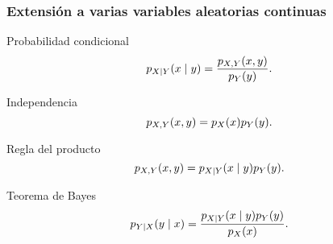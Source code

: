 \documentclass[table]{beamer}
\begin{document}
\begin{frame}
    \frametitle{Extensión a varias variables aleatorias continuas}
    \begin{block}{Probabilidad condicional}
        \begin{equation*}
            \ppdf{X \mid Y}{x \mid y} = \frac{\ppdf{X, Y}{x, y}}{\ppdf{Y}{y}} .
        \end{equation*}
    \end{block}
    \begin{block}{Independencia}
        \begin{equation*}
            \ppdf{X, Y}{x, y} = \ppdf{X}{x} \ppdf{Y}{y} .
        \end{equation*}
    \end{block}
    \begin{block}{Regla del producto}
        \begin{equation*}
            \ppdf{X, Y}{x, y} = \ppdf{X \mid Y}{x \mid y} \ppdf{Y}{y} .
        \end{equation*}
    \end{block}
    \begin{block}{Teorema de Bayes}
        \begin{equation*}
            \ppdf{Y \mid X}{y \mid x} = \frac{\ppdf{X \mid Y}{x \mid y} \ppdf{Y}{y}}{\ppdf{X}{x}} .
        \end{equation*}
    \end{block}
\end{frame}
\end{document}
